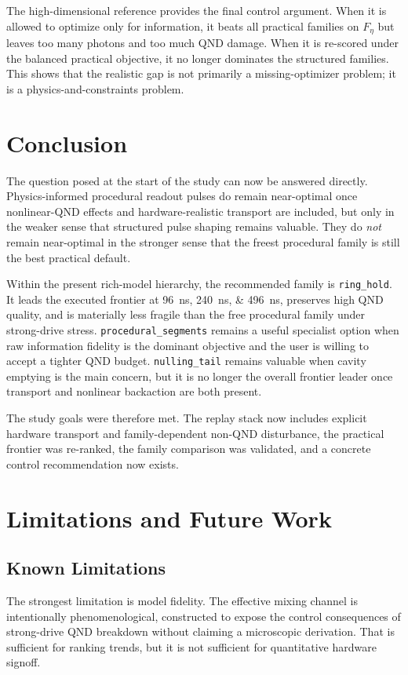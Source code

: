 \documentclass[11pt, a4paper]{article}
\begin{document}
The high-dimensional reference provides the final control argument. When it is allowed to
optimize only for information, it beats all practical families on $F_\eta$ but leaves too
many photons and too much QND damage. When it is re-scored under the balanced practical
objective, it no longer dominates the structured families. This shows that the realistic
gap is not primarily a missing-optimizer problem; it is a physics-and-constraints problem.

\section{Conclusion}
The question posed at the start of the study can now be answered directly. Physics-informed
procedural readout pulses do remain near-optimal once nonlinear-QND effects and
hardware-realistic transport are included, but only in the weaker sense that structured
pulse shaping remains valuable. They do \emph{not} remain near-optimal in the stronger
sense that the freest procedural family is still the best practical default.

Within the present rich-model hierarchy, the recommended family is
\texttt{ring\_hold}. It leads the executed frontier at \SIlist{96;240;496}{ns}, preserves
high QND quality, and is materially less fragile than the free procedural family under
strong-drive stress. \texttt{procedural\_segments} remains a useful specialist option when
raw information fidelity is the dominant objective and the user is willing to accept a
tighter QND budget. \texttt{nulling\_tail} remains valuable when cavity emptying is the
main concern, but it is no longer the overall frontier leader once transport and nonlinear
backaction are both present.

The study goals were therefore met. The replay stack now includes explicit hardware
transport and family-dependent non-QND disturbance, the practical frontier was re-ranked,
the family comparison was validated, and a concrete control recommendation now exists.

\section{Limitations and Future Work}

\subsection{Known Limitations}
The strongest limitation is model fidelity. The effective mixing channel is intentionally
phenomenological, constructed to expose the control consequences of strong-drive QND
breakdown without claiming a microscopic derivation. That is sufficient for ranking trends,
but it is not sufficient for quantitative hardware signoff.
\end{document}
